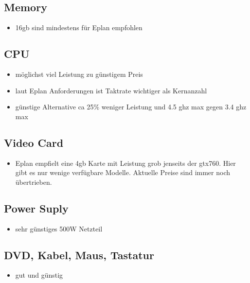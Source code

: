 \documentclass[11pt]{article}
\begin{document}
\subsection{Memory}
\label{sec:org4b98fad}
\begin{itemize}
\item 16gb sind mindestens für Eplan empfohlen
\end{itemize}
\subsection{CPU}
\label{sec:orgf2fddfc}
\begin{itemize}
\item möglichst viel Leistung zu günstigem Preis
\item laut Eplan Anforderungen ist Taktrate wichtiger als Kernanzahl
\item günstige Alternative ca 25\% weniger Leistung und 4.5 ghz max gegen 3.4 ghz max
\end{itemize}
\subsection{Video Card}
\label{sec:orgec61ab3}
\begin{itemize}
\item Eplan empfielt eine 4gb Karte mit Leistung grob jenseits der gtx760. Hier gibt es nur wenige verfügbare Modelle. Aktuelle Preise sind immer noch übertrieben.
\end{itemize}
\subsection{Power Suply}
\label{sec:org56eec55}
\begin{itemize}
\item sehr günstiges 500W Netzteil
\end{itemize}

\subsection{DVD, Kabel, Maus, Tastatur}
\label{sec:orga041a6a}
\begin{itemize}
\item gut und günstig
\end{itemize}
\end{document}

